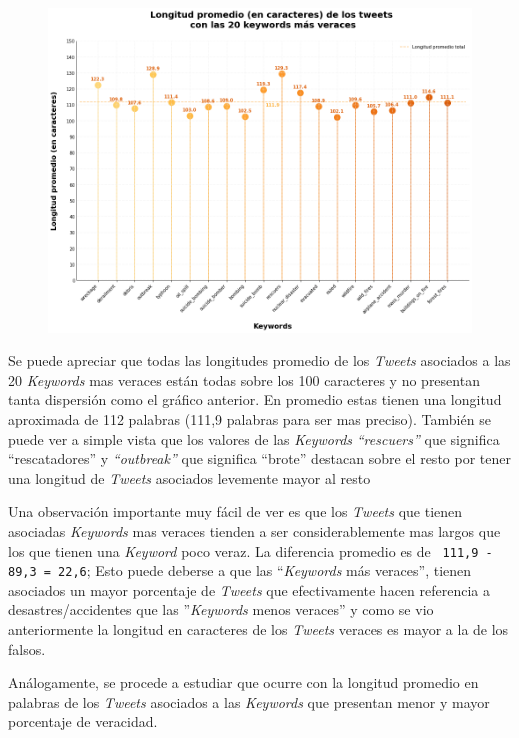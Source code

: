 \documentclass[titlepage,a4paper]{article}
\begin{document}
    \begin{figure}[H]
    \centering
    \includegraphics[width=1\textwidth]{graficos/Analisis de Keyword/long_prom_char_keywords_veraces.png}
    \caption{} 
    \end{figure}
    
    Se puede apreciar que todas las longitudes promedio de los \textit{Tweets} asociados a las 20 \textit{Keywords} mas veraces están todas sobre los 100 caracteres y no presentan tanta dispersión como el gráfico anterior. En promedio estas tienen una longitud aproximada de 112 palabras (111,9 palabras para ser mas preciso). También se puede ver a simple vista que los valores de las \textit{\textit{Keywords}} \textit{``rescuers''} que significa ``rescatadores'' y \textit{``outbreak''} que significa ``brote'' destacan sobre el resto por tener una longitud de \textit{Tweets} asociados levemente mayor al resto  
    
    Una observación importante muy fácil de ver es que los \textit{Tweets} que tienen asociadas \textit{Keywords} mas veraces tienden a ser considerablemente mas largos que los que tienen una \textit{Keyword} poco veraz. La diferencia promedio es de \texttt{ 111,9 - 89,3 = 22,6}; Esto puede deberse a que las ``\textit{Keywords} más veraces'', tienen asociados un mayor porcentaje de \textit{Tweets} que efectivamente hacen referencia a desastres/accidentes que las ''\textit{Keywords} menos veraces'' y como se vio anteriormente la longitud en caracteres de los \textit{Tweets} veraces es mayor a la de los falsos.
    
    \newpage
    Análogamente, se procede a estudiar que ocurre con la longitud promedio en palabras de los \textit{Tweets} asociados a las \textit{Keywords} que presentan menor y mayor porcentaje de veracidad.
    
\end{document}
